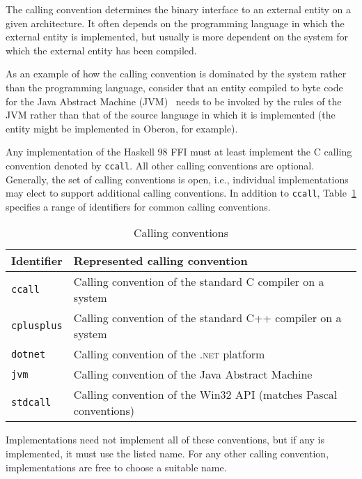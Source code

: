 \documentclass[a4paper,twosides]{article}
\newcommand{\code}[1]{\texttt{#1}}      %
\begin{document}
The calling convention determines the binary interface to an external entity
on a given architecture.  It often depends on the programming language in
which the external entity is implemented, but usually is more dependent on the
system for which the external entity has been compiled.

As an example of how the calling convention is dominated by the system rather
than the programming language, consider that an entity compiled to byte code
for the Java Abstract Machine (JVM)~\cite{lindholm-etal:JVM} needs to be
invoked by the rules of the JVM rather than that of the source language in
which it is implemented (the entity might be implemented in Oberon, for
example).

Any implementation of the Haskell 98 FFI must at least implement the C calling
convention denoted by \code{ccall}.  All other calling conventions are
optional.  Generally, the set of calling conventions is open, i.e., individual
implementations may elect to support additional calling conventions.  In
addition to \code{ccall}, Table~\ref{tab:callconv} specifies a range of
identifiers for common calling conventions.
%
\begin{table}[tbp]
  \begin{center}
    \begin{tabular}{|l|l|}
      \hline
      Identifier & Represented calling convention\\
      \hline\hline
      \code{ccall} 
      & Calling convention of the standard C compiler on a system\\
      \code{cplusplus}
      & Calling convention of the standard C{+}{+} compiler on a system\\
      \code{dotnet}
      & Calling convention of the \textsc{.net} platform\\
      \code{jvm} 
      & Calling convention of the Java Abstract Machine\\
      \code{stdcall}
      & Calling convention of the Win32 API (matches Pascal conventions)\\
      \hline
    \end{tabular}
    \caption{Calling conventions}
    \label{tab:callconv}
  \end{center}
\end{table}
%
Implementations need not implement all of these conventions, but if any is
implemented, it must use the listed name.  For any other calling convention,
implementations are free to choose a suitable name.
\end{document}
